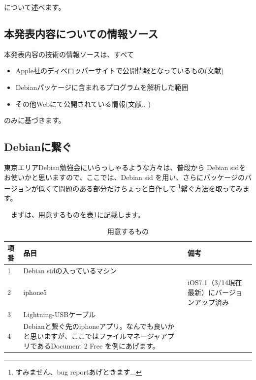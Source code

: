\documentclass[mingoth,a4paper]{jsarticle}
\begin{document}
について述べます。

\subsection{本発表内容についての情報ソース}

 本発表内容の技術の情報ソースは、すべて

\begin{itemize}
\item Apple社のディベロッパーサイトで公開情報となっているもの(文献\cite{apple-fs-program-ref})
\item Debianパッケージに含まれるプログラムを解析した範囲
\item その他Webにて公開されている情報(文献\cite{usb-mux-desc},\cite{afc-desc},
\cite{iphone-hacking-accessories-desc})
\end{itemize}

のみに基づきます。

\subsection{Debianに繋ぐ}

 東京エリアDebian勉強会にいらっしゃるような方々は、普段から
Debian sidをお使いかと思いますので、ここでは、Debian sid
を用い、さらにパッケージのバージョンが低くて問題のある部分だけちょっと自作して
\footnote{すみません、bug reportあげときます...}繋ぐ方法を取ってみます。

　まずは、用意するものを表\ref{tab:iphone5-debian-prerequisite}に記載します。

\begin{table}[ht]
\begin{center}
\begin{tabular}{|l|p{7cm}|l|}
\hline 
項番 & 品目 & 備考 \\ \hline
1 & Debian sidの入っているマシン & \\ \hline
2 & iphone5 & iOS7.1（3/14現在最新）にバージョンアップ済み \\ \hline
3 & Lightning-USBケーブル & \\ \hline
4 & Debianと繋ぐ先のiphoneアプリ。なんでも良いかと思いますが、ここではファイルマネージャアプリであるDocument 2 Free を例にあげます。& \\ \hline
\end{tabular}
\caption{用意するもの}\label{tab:iphone5-debian-prerequisite}
\end{center}
\end{table}
\end{document}
